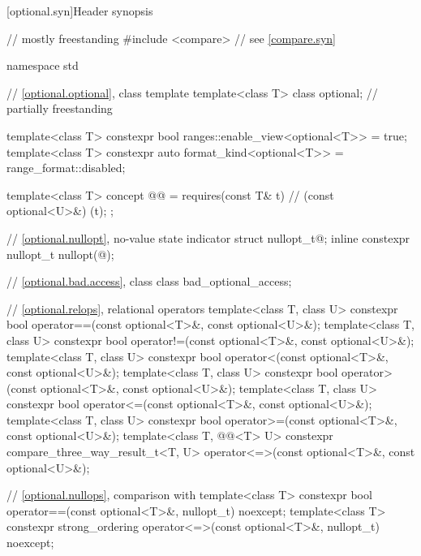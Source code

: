 [optional.syn]{Header  synopsis}

%
\begin{codeblock}
// mostly freestanding
#include <compare>              // see \ref{compare.syn}

namespace std {
  // \ref{optional.optional}, class template 
  template<class T>
    class optional;                                                     // partially freestanding

  template<class T>
    constexpr bool ranges::enable_view<optional<T>> = true;
  template<class T>
    constexpr auto format_kind<optional<T>> = range_format::disabled;

  template<class T>
    concept @@ = requires(const T& t) {       // (const optional<U>&){ }(t);
    };

  // \ref{optional.nullopt}, no-value state indicator
  struct nullopt_t{@\seebelow@};
  inline constexpr nullopt_t nullopt(@\unspec@);

  // \ref{optional.bad.access}, class 
  class bad_optional_access;

  // \ref{optional.relops}, relational operators
  template<class T, class U>
    constexpr bool operator==(const optional<T>&, const optional<U>&);
  template<class T, class U>
    constexpr bool operator!=(const optional<T>&, const optional<U>&);
  template<class T, class U>
    constexpr bool operator<(const optional<T>&, const optional<U>&);
  template<class T, class U>
    constexpr bool operator>(const optional<T>&, const optional<U>&);
  template<class T, class U>
    constexpr bool operator<=(const optional<T>&, const optional<U>&);
  template<class T, class U>
    constexpr bool operator>=(const optional<T>&, const optional<U>&);
  template<class T, @@<T> U>
    constexpr compare_three_way_result_t<T, U>
      operator<=>(const optional<T>&, const optional<U>&);

  // \ref{optional.nullops}, comparison with 
  template<class T> constexpr bool operator==(const optional<T>&, nullopt_t) noexcept;
  template<class T>
    constexpr strong_ordering operator<=>(const optional<T>&, nullopt_t) noexcept;

}
\end{codeblock}
